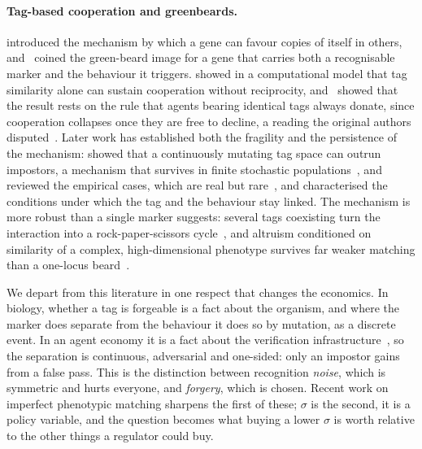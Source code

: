 \documentclass[11pt,a4paper]{article}
\theoremstyle{definition}
\begin{document}
\paragraph{Tag-based cooperation and greenbeards.}
\citet{hamilton1964genetical1,hamilton1964genetical2} introduced the mechanism by which a gene can
favour copies of itself in others, and~\citet{dawkins1976selfish} coined the
green-beard image for a gene that carries both a recognisable marker and the
behaviour it triggers. \citet{riolo2001evolution} showed in a computational
model that tag similarity alone can sustain cooperation without reciprocity,
and~\citet{roberts2002does} showed that the result rests on the rule that
agents bearing identical tags always donate, since cooperation collapses once
they are free to decline, a reading the original authors
disputed~\citep{riolo2002similarity}.
Later work has established both the fragility and the persistence of the
mechanism: \citet{jansen2006altruism} showed that a continuously mutating tag
space can outrun impostors, a mechanism that survives in finite stochastic
populations~\citep{traulsen2007chromodynamics}, and~\citet{gardner2010greenbeards}
reviewed the empirical cases, which are real but
rare~\citep{keller1998selfish,queller2003single}, and characterised the conditions
under which the tag and the behaviour stay linked. The mechanism is more robust
than a single marker suggests: several tags coexisting turn the interaction into
a rock-paper-scissors cycle~\citep{biernaskie2013multicoloured}, and altruism
conditioned on similarity of a complex, high-dimensional phenotype survives far
weaker matching than a one-locus beard~\citep{bavik2023fiftyshades}.

We depart from this
literature in one respect that changes the economics. In biology, whether a tag
is forgeable is a fact about the organism, and where the marker does separate
from the behaviour it does so by mutation, as a discrete event. In an agent
economy it is a fact about the verification
infrastructure~\citep{jovanovic2024watermarkstealing,anbiaee2026threatmodeling},
so the separation is continuous, adversarial and one-sided: only an impostor
gains from a false pass. This is the distinction between recognition
\emph{noise}, which is symmetric and hurts everyone, and \emph{forgery}, which
is chosen. Recent work on imperfect phenotypic matching sharpens the first of
these; $\sigma$ is the second, it is a policy variable, and the
question becomes what buying a lower $\sigma$ is worth relative to the other
things a regulator could buy.
\end{document}
